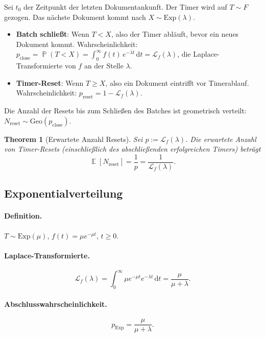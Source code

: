 ﻿\documentclass[12pt, a4paper]{article}
\newtheorem{theorem}{Theorem}[section]
\DeclareMathOperator{\E}{\mathbb{E}}
\DeclareMathOperator{\Prob}{\mathbb{P}}
\newcommand{\Geo}{\mathrm{Geo}}
\newcommand{\Exp}{\mathrm{Exp}}
\begin{document}
Sei $t_0$ der Zeitpunkt der letzten Dokumentankunft. Der Timer wird auf
$T \sim F$ gezogen. Das nächste Dokument kommt nach $X \sim \Exp(\lambda)$.

\begin{itemize}[noitemsep]
  \item \textbf{Batch schließt}: Wenn $T < X$, also der Timer abläuft, bevor
        ein neues Dokument kommt. Wahrscheinlichkeit:
        $p_{\mathrm{close}} = \Prob(T < X) = \int_0^\infty f(t)\,e^{-\lambda t}\,\mathrm{d}t
        = \mathcal{L}_f(\lambda)$, die Laplace-Transformierte von $f$ an der
        Stelle $\lambda$.
  \item \textbf{Timer-Reset}: Wenn $T \geq X$, also ein Dokument eintrifft
        vor Timerablauf. Wahrscheinlichkeit: $p_{\mathrm{reset}} = 1 - \mathcal{L}_f(\lambda)$.
\end{itemize}

Die Anzahl der Resets bis zum Schließen des Batches ist geometrisch verteilt:
$N_{\mathrm{reset}} \sim \Geo(p_{\mathrm{close}})$.

\begin{theorem}[Erwartete Anzahl Resets]\label{thm:resets}
Sei $p := \mathcal{L}_f(\lambda)$. Die erwartete Anzahl von Timer-Resets
(einschließlich des abschließenden erfolgreichen Timers) beträgt
\[
  \E[N_{\mathrm{reset}}] = \frac{1}{p} = \frac{1}{\mathcal{L}_f(\lambda)}.
\]
\end{theorem}

\subsection{Exponentialverteilung}\label{subsec:exp}

\paragraph{Definition.}
$T \sim \Exp(\mu)$, $f(t) = \mu e^{-\mu t}$, $t \geq 0$.

\paragraph{Laplace-Transformierte.}
\[
  \mathcal{L}_f(\lambda) = \int_0^\infty \mu e^{-\mu t} e^{-\lambda t}\,\mathrm{d}t
  = \frac{\mu}{\mu + \lambda}.
\]

\paragraph{Abschlusswahrscheinlichkeit.}
\[
  p_{\Exp} = \frac{\mu}{\mu + \lambda}.
\]
\end{document}
